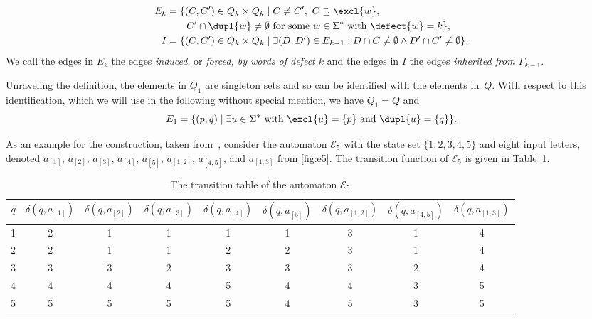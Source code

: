 \begin{definition}
	\begin{align*}
		E_k & =  \{ (C, C') \in Q_k \times Q_k \mid C \ne C',~  C \supseteq \excl{w}, 
		\\ & \qquad
		C' \cap \dupl{w} \ne \emptyset \text{ for some } w \in \Sigma^* \text{ with } \defect{w} = k \}, \\
		I   & =  \{ (C, C') \in Q_k \times Q_k \mid \exists (D, D') \in E_{k-1} : D \cap C \ne \emptyset \land 
		D' \cap C' \ne \emptyset \}.
	\end{align*}
	We call the edges in $E_k$ the edges \emph{induced}, or \emph{forced, by words of defect $k$} 
	and the edges in $I$ the edges \emph{inherited from $\Gamma_{k-1}$}. 
\end{definition}

Unraveling the definition,
the elements in $Q_1$ are singleton sets
and so can be identified with the elements in~$Q$. With respect to this identification,
which we will use in the following without special mention, we have $Q_1 = Q$ and 
\begin{equation}\label{syncmax:eqn:E1}
	E_1 = \{ (p, q) \mid \exists u \in \Sigma^* \text{ with $\excl{u} = \{p\}$ and $\dupl{u} = \{q\}$} \}.
\end{equation}

As an example for the construction, taken from~\cite{BondarCV23}, consider the automaton $\mathcal{E}_5$ with the state set $\{1,2,3,4,5\}$ and eight input letters, denoted $a_{[1]}$, $a_{[2]}$, $a_{[3]}$, $a_{[4]}$, $a_{[5]}$, $a_{[1,2]}$, $a_{[4,5]}$, and $a_{[1,3]}$
from \cref{fig:e5}. The transition function of $\mathcal{E}_5$ is given in Table~\ref{tb:e5}.
\begin{table}[ht]
	\caption{The transition table of the automaton $\mathcal{E}_5$}\label{tb:e5}
	\begin{center}
		\begin{tabular}{c@{\ }|@{\ }c@{\ }c@{\ }c@{\ }c@{\ }c@{\ }c@{\ }c@{\ }c}
			$q$  & $\delta(q, a_{[1]})$ & $\delta(q,a_{[2]})$ & $\delta(q, a_{[3]})$  & $\delta(q, a_{[4]})$ & $\delta(q, a_{[5]})$ & $\delta(q, a_{[1,2]})$ & $\delta(q, a_{[4,5]})$ & $\delta(q, a_{[1,3]})$ \mathstrut\\
			\hline
			1 & 2 & 1 & 1 & 1 & 1 & 3 & 1 & 4\mathstrut\\
			2 & 2 & 1 & 1 & 2 & 2 & 3 & 1 & 4\mathstrut\\
			3 & 3 & 3 & 2 & 3 & 3 & 3 & 2 & 4\mathstrut\\
			4 & 4 & 4 & 4 & 5 & 4 & 4 & 3 & 5\mathstrut\\
			5 & 5 & 5 & 5 & 5 & 4 & 5 & 3 & 5\mathstrut
		\end{tabular}
	\end{center}
\end{table}


